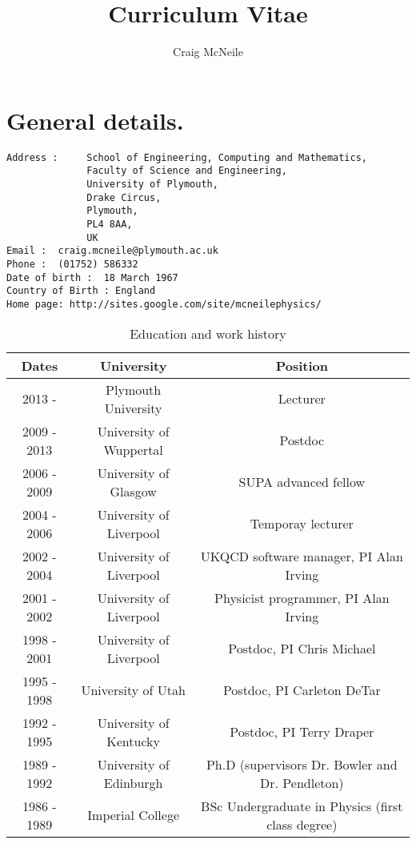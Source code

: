 \documentclass[12pt]{article}
\begin{document}
\title{Curriculum Vitae}

\author{Craig McNeile}

\maketitle

\section{General details.}
\begin{verbatim}
Address :     School of Engineering, Computing and Mathematics,
              Faculty of Science and Engineering,
              University of Plymouth,
              Drake Circus,
              Plymouth,
              PL4 8AA,
              UK             
Email :  craig.mcneile@plymouth.ac.uk
Phone :  (01752) 586332
Date of birth :  18 March 1967
Country of Birth : England
Home page: http://sites.google.com/site/mcneilephysics/
\end{verbatim}

%

\begin{table}[tb]
\centering
\begin{tabular}{|c|c|c|} \hline
Dates & University  &  Position \\  \hline
2013 -  & Plymouth University  & Lecturer \\
2009 - 2013 & University of Wuppertal & Postdoc \\
2006 - 2009 & University of Glasgow & SUPA advanced fellow \\
2004 - 2006 & University of Liverpool & Temporay lecturer \\
2002 - 2004 & University of Liverpool & UKQCD software manager, PI Alan Irving \\
2001 - 2002 & University of Liverpool & Physicist programmer, PI Alan Irving \\
1998 - 2001 & University of Liverpool & Postdoc, PI Chris Michael \\
1995 - 1998 & University of Utah & Postdoc, PI Carleton DeTar \\
1992 - 1995 & University of Kentucky & Postdoc, PI Terry Draper \\
1989 - 1992 & University of Edinburgh & Ph.D (supervisors Dr. Bowler and Dr. Pendleton) \\ 
1986 - 1989 & Imperial College & BSc Undergraduate in Physics (first class degree) \\
\hline
\end{tabular}
\label{tb:life}
\caption{Education and work history}
\end{table}
\end{document}
